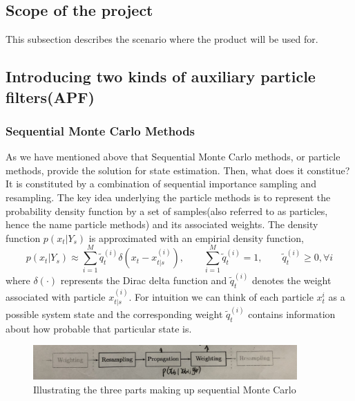 \documentclass[11pt,oneside,a4paper]{article}
\begin{document}
\subsection{Scope of the project}
This subsection describes the scenario where the product will be used for.

\subsection{Introducing two kinds of auxiliary particle filters(APF)}
\subsubsection{Sequential Monte Carlo Methods}
As we have mentioned above that Sequential Monte Carlo methods, or particle methods, provide the solution for state estimation. Then, what does it
constitue? It is constituted by a combination of sequential importance sampling and resampling. The key idea underlying the particle methods is to represent
the probability density function by a set of samples(also referred to as particles, hence the name particle methods) and its associated weights.
The density function $p(x_{t}|Y_s) $ is approximated with an empirial density function,
\begin{equation}
p(x_{t}|Y_s) \approx \sum_{i=1}^M\tilde{q}_t^{(i)}\delta(x_t - x_{t|s}^{(i)}), \qquad \sum_{i=1}^{M}\tilde{q}_{t}^{(i)} = 1, \qquad \tilde{q}_{t}^{(i)} \geq 0, \forall{i}
\end{equation}
where $\delta(\cdot) $ represents the Dirac delta function and $\tilde{q}_{t}^{(i)} $ denotes the weight associated with particle $x_{t|s}^{(i)} $. For intuition we can think of each
particle $x_{t}^{i} $ as a possible system state and the corresponding weight $\tilde{q}_{t}^{(i)} $ contains information about how probable that particular state is.
\begin{figure}[H]
  \begin{center}
  \includegraphics[width=0.9\textwidth]{./source/5.JPG}
  \caption{Illustrating the three parts making up sequential Monte Carlo}
  \label{}
  \end{center}
\end{figure}
\end{document}

